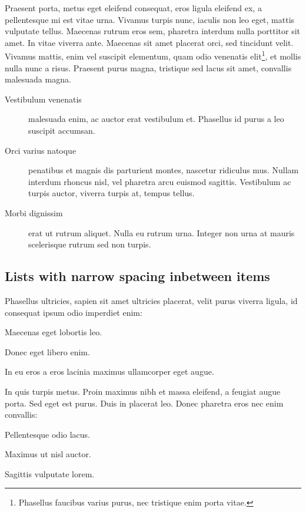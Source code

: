 Praesent porta, metus eget eleifend consequat, eros ligula eleifend ex, a pellentesque mi est vitae urna. Vivamus turpis nunc, iaculis non leo eget, mattis vulputate tellus. Maecenas rutrum eros sem, pharetra interdum nulla porttitor sit amet. In vitae viverra ante. Maecenas sit amet placerat orci, sed tincidunt velit. Vivamus mattis, enim vel suscipit elementum, quam odio venenatis elit\footnote{Phasellus faucibus varius purus, nec tristique enim porta vitae.}, et mollis nulla nunc a risus. Praesent purus magna, tristique sed lacus sit amet, convallis malesuada magna. 

\begin{description}
	\item[Vestibulum venenatis] malesuada enim, ac auctor erat vestibulum et. Phasellus id purus a leo suscipit accumsan.
	\item[Orci varius natoque] penatibus et magnis dis parturient montes, nascetur ridiculus mus. Nullam interdum rhoncus nisl, vel pharetra arcu euismod sagittis. Vestibulum ac turpis auctor, viverra turpis at, tempus tellus.
	\item[Morbi dignissim] erat ut rutrum aliquet. Nulla eu rutrum urna. Integer non urna at mauris scelerisque rutrum sed non turpis.
\end{description}

\subsection{Lists with narrow spacing inbetween items}

Phasellus ultricies, sapien sit amet ultricies placerat, velit purus viverra ligula, id consequat ipsum odio imperdiet enim:
\begin{compactenum}
	\item Maecenas eget lobortis leo.
	\item Donec eget libero enim.
	\item In eu eros a eros lacinia maximus ullamcorper eget augue.
\end{compactenum}

\bigskip

In quis turpis metus. Proin maximus nibh et massa eleifend, a feugiat augue porta. Sed eget est purus. Duis in placerat leo. Donec pharetra eros nec enim convallis:
\begin{compactitem}
	\item Pellentesque odio lacus.
	\item Maximus ut nisl auctor.
	\item Sagittis vulputate lorem.
\end{compactitem}

